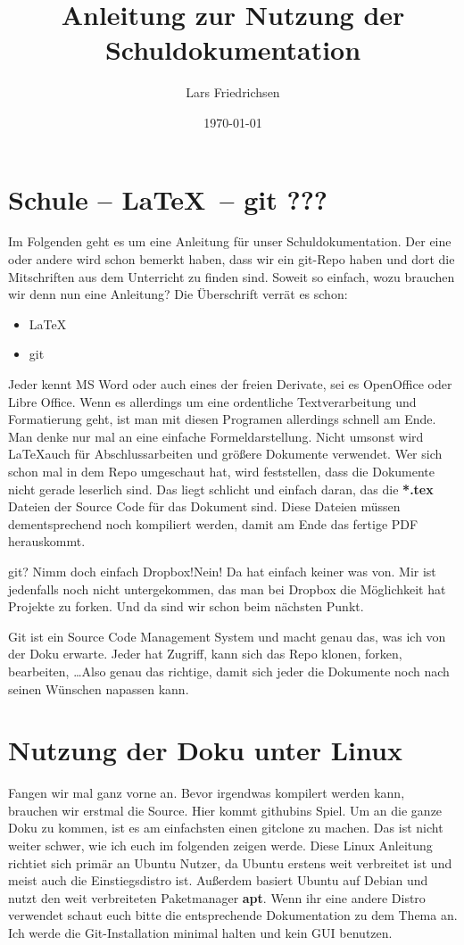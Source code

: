 \documentclass[a4paper,11pt]{scrartcl}	%
\title{Anleitung zur Nutzung der Schuldokumentation}
\author{Lars Friedrichsen}
\date{\today}
\begin{document}
\maketitle
\tableofcontents
\lstset{escapechar=\@}

\newpage

\section{Schule -- \LaTeX\ -- git ???}
Im Folgenden geht es um eine Anleitung für unser Schuldokumentation. Der eine oder andere wird schon bemerkt haben, 
dass wir ein git-Repo haben und dort die Mitschriften aus dem Unterricht zu finden sind. Soweit so einfach, wozu brauchen
wir denn nun eine Anleitung? Die Überschrift verrät es schon:
	
	\begin{itemize}
		\item \LaTeX
		\item git
	\end{itemize}

Jeder kennt MS Word oder auch eines der freien Derivate, sei es OpenOffice oder Libre Office. Wenn es allerdings um eine
ordentliche Textverarbeitung und Formatierung geht, ist man mit diesen Programen allerdings schnell am Ende. Man denke nur
mal an eine einfache Formeldarstellung. Nicht umsonst wird \LaTeX auch für Abschlussarbeiten und größere Dokumente verwendet.
Wer sich schon mal in dem Repo umgeschaut hat, wird feststellen, dass die Dokumente nicht gerade leserlich sind.
Das liegt schlicht und einfach daran, das die \textbf{*.tex} Dateien der Source Code für das Dokument sind. 
Diese Dateien müssen dementsprechend noch kompiliert werden, damit am Ende das fertige PDF herauskommt.\par
\glqq git? Nimm doch einfach Dropbox!\grqq Nein! Da hat einfach keiner was von. Mir ist jedenfalls noch nicht untergekommen,
das man bei Dropbox die Möglichkeit hat Projekte zu forken. Und da sind wir schon beim nächsten Punkt. \par
Git ist ein Source Code Management System und macht genau das, was ich von der Doku erwarte. Jeder hat Zugriff, kann sich das
Repo klonen, forken, bearbeiten, \ldots Also genau das richtige, damit sich jeder die Dokumente noch nach seinen Wünschen 
napassen kann.

\section{Nutzung der Doku unter Linux}
Fangen wir mal ganz vorne an. Bevor irgendwas kompilert werden kann, brauchen wir erstmal die Source. Hier kommt
\glqq github\grqq ins Spiel. Um an die ganze Doku zu kommen, ist es am einfachsten einen gitclone zu machen.
Das ist nicht weiter schwer, wie ich euch im folgenden zeigen werde. Diese Linux Anleitung richtiet sich primär an 
Ubuntu Nutzer, da Ubuntu erstens weit verbreitet ist und meist auch die Einstiegsdistro ist. Außerdem basiert Ubuntu auf
Debian und nutzt den weit verbreiteten Paketmanager \textbf{apt}. Wenn ihr eine andere Distro verwendet schaut euch bitte 
die entsprechende Dokumentation zu dem Thema an. Ich werde die Git-Installation minimal halten und kein GUI benutzen.
\end{document}
